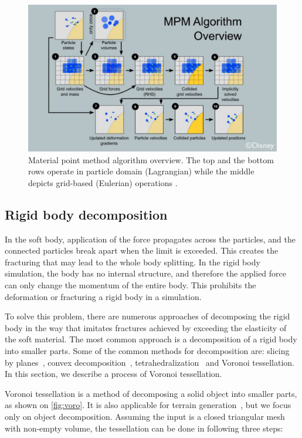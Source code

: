 \begin{figure}
\centering
\includegraphics[width=\textwidth]{img/MPM}
\caption{Material point method algorithm overview. The top and the bottom rows operate in particle domain (Lagrangian) while the middle depicts grid-based (Eulerian) operations \cite{disney}.
}
\label{fig:mpm}
\end{figure}

\subsection{Rigid body decomposition}
In the soft body, application of the force propagates across the particles, and the connected particles break apart when the limit is exceeded. This creates the fracturing that may lead to the whole body splitting. In the rigid body simulation, the body has no internal structure, and therefore the applied force can only change the momentum of the entire body. This prohibits the deformation or fracturing a rigid body in a simulation.

To solve this problem, there are numerous approaches of decomposing the rigid body in the way that imitates fractures achieved by exceeding the elasticity of the soft material. The most common approach is a decomposition of a rigid body into smaller parts. Some of the common methods for decomposition are: slicing by planes~\cite{minettooptimal}, convex decomposition~\cite{Lien:2007:ACD:1236246.1236265}, tetrahedralization~\cite{frey1996delaunay} and Voronoi tessellation. In this section, we describe a process of Voronoi tessellation.

Voronoi tessellation is a method of decomposing a solid object into smaller parts, as shown on \cref{fig:voro}. It is also applicable for \eg terrain generation~\cite{voronoiterrainrealtime}, but we focus only on object decomposition. Assuming the input is a closed triangular mesh with non-empty volume, the tessellation can be done in following three steps:


